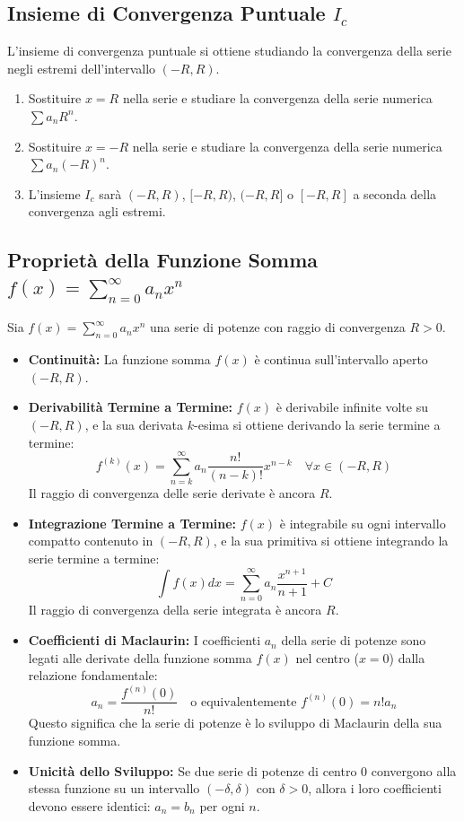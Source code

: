 \documentclass[10pt, a4paper]{article}
\begin{document}
    \subsection{Insieme di Convergenza Puntuale $I_c$}
        L'insieme di convergenza puntuale si ottiene studiando la convergenza della serie negli estremi dell'intervallo $(-R, R)$.
        \begin{enumerate}
            \item Sostituire $x = R$ nella serie e studiare la convergenza della serie numerica $\sum a_n R^n$.
            \item Sostituire $x = -R$ nella serie e studiare la convergenza della serie numerica $\sum a_n (-R)^n$.
            \item L'insieme $I_c$ sarà $(-R,R)$, $[-R,R)$, $(-R,R]$ o $[-R,R]$ a seconda della convergenza agli estremi.
        \end{enumerate}
    \subsection{Proprietà della Funzione Somma $f(x) = \sum_{n=0}^{\infty}a_n x^n$}
        Sia $f(x) = \sum_{n=0}^{\infty}a_n x^n$ una serie di potenze con raggio di convergenza $R > 0$.
        \begin{itemize}
            \item \textbf{Continuità:} La funzione somma $f(x)$ è continua sull'intervallo aperto $(-R, R)$.
            \item \textbf{Derivabilità Termine a Termine:} $f(x)$ è derivabile infinite volte su $(-R, R)$, e la sua derivata $k$-esima si ottiene derivando la serie termine a termine:
            \begin{equation*}
                f^{(k)}(x) = \sum_{n=k}^{\infty}a_n \frac{n!}{(n-k)!}x^{n-k} \quad \forall x \in (-R,R)
            \end{equation*}
            Il raggio di convergenza delle serie derivate è ancora $R$.
            \item \textbf{Integrazione Termine a Termine:} $f(x)$ è integrabile su ogni intervallo compatto contenuto in $(-R, R)$, e la sua primitiva si ottiene integrando la serie termine a termine:
            \begin{equation*}
                \int f(x)dx = \sum_{n=0}^{\infty}a_n\frac{x^{n+1}}{n+1} + C
            \end{equation*}
            Il raggio di convergenza della serie integrata è ancora $R$.
            \item \textbf{Coefficienti di Maclaurin:} I coefficienti $a_n$ della serie di potenze sono legati alle derivate della funzione somma $f(x)$ nel centro ($x=0$) dalla relazione fondamentale:
            $$a_n = \frac{f^{(n)}(0)}{n!} \quad \text{o equivalentemente } f^{(n)}(0) = n!a_n$$
            Questo significa che la serie di potenze è lo sviluppo di Maclaurin della sua funzione somma.
            \item \textbf{Unicità dello Sviluppo:} Se due serie di potenze di centro 0 convergono alla stessa funzione su un intervallo $(-\delta, \delta)$ con $\delta > 0$, allora i loro coefficienti devono essere identici: $a_n = b_n$ per ogni $n$.
        \end{itemize}
\end{document}
